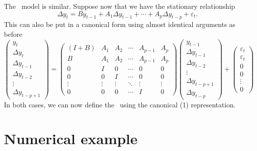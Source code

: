 \documentclass[12pt,fleqn]{article}
\newcommand{\vep}{\varepsilon}
\newcommand{\VECM}{\allcaps{VECM}}
\begin{document}
The \VECM\ model is similar. Suppose now that we have the stationary
relationship
\begin{equation*}
  \Delta y_t = B y_{t-1} + A_1 \Delta y_{t-1} + \cdots + A_p \Delta
  y_{t-p} + \vep_t.
\end{equation*}
This can also be put in a canonical form using almost identical
arguments as before
\begin{equation*}
  \begin{pmatrix}
    y_t \\ \Delta y_t \\ \Delta y_{t-1} \\ \Delta y_{t-2} \\ \vdots \\
    \Delta y_{t-p+1}
  \end{pmatrix}
  =
  \begin{pmatrix}
    (I + B) & A_1 & A_2 & \cdots & A_{p-1} & A_p \\
    B & A_1 & A_2 & \cdots & A_{p-1} & A_p \\
    0 & I   & 0   & \cdots & 0 & 0 \\
    0 & 0   & I   & \cdots & 0 & 0 \\
    \vdots & \vdots & \vdots & \ddots & \vdots & \vdots \\
    0 & 0 & 0 & \cdots & I & 0
  \end{pmatrix}
  \begin{pmatrix}
    y_{t-1} \\ \Delta y_{t-1} \\ \Delta y_{t-2} \\ \vdots \\ \Delta y_{t-p+1} \\
    \Delta y_{t-p}
  \end{pmatrix}
  +
  \begin{pmatrix}
    \vep_t \\ \vep_t \\ 0 \\ 0 \\ \vdots \\ 0
  \end{pmatrix}
\end{equation*}
In both cases, we can now define the \IRF\ using the canonical \VAR(1)
representation.

\section{Numerical example}\label{example}
\end{document}
